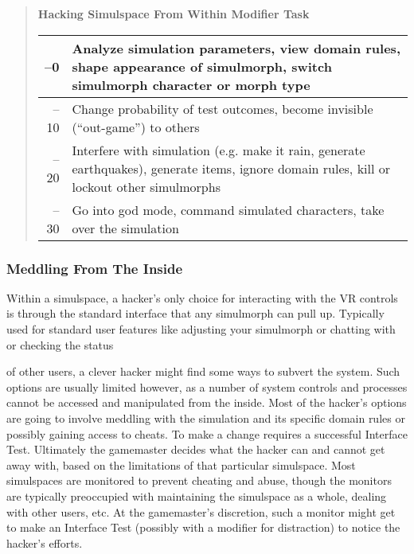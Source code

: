 \begin{quotation} \textbf{Hacking Simulspace From Within Modifier Task} \\ \begin{tabularx}{\hline}{|rX|} \hline

–0 &Analyze simulation parameters, view domain rules, shape appearance of simulmorph, switch simulmorph character or morph type \\ \hline

–10 &Change probability of test outcomes, become invisible (“out-game”) to others \\ \hline

–20 &Interfere with simulation (e.g. make it rain, generate earthquakes), generate items, ignore domain rules, kill or lockout other simulmorphs \\ \hline

–30 &Go into god mode, command simulated characters, take over the simulation \\ \hline

\end{tabularx} \end{quotation} 

\subsubsection{Meddling From The Inside} 

Within a simulspace, a hacker's only choice for interacting with the VR controls is through the standard interface that any simulmorph can pull up. Typically used for standard user features like adjusting your simulmorph or chatting with or checking the status 

of other users, a clever hacker might find some ways to subvert the system. Such options are usually limited however, as a number of system controls and processes cannot be accessed and manipulated from the inside. Most of the hacker's options are going to involve meddling with the simulation and its specific domain rules or possibly gaining access to cheats. To make a change requires a successful Interface Test. Ultimately the gamemaster decides what the hacker can and cannot get away with, based on the limitations of that particular simulspace. Most simulspaces are monitored to prevent cheating and abuse, though the monitors are typically preoccupied with maintaining the simulspace as a whole, dealing with other users, etc. At the gamemaster's discretion, such a monitor might get to make an Interface Test (possibly with a modifier for distraction) to notice the hacker's efforts. 

